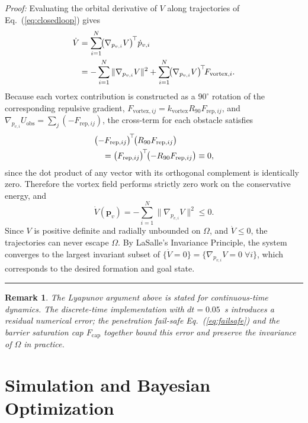 \documentclass[letterpaper, 10 pt, journal, twoside]{IEEEtran}
\newtheorem{remark}{Remark}
\def\qed{ \rule{.1in}{.1in}}
\newcommand{\eqnref}[1]{Eq.~(\ref{#1})}
\begin{document}
\textit{Proof:} Evaluating the orbital derivative of $V$ along trajectories
of \eqnref{eq:closedloop} gives
\begin{align}
  \dot{V}&=\sum_{i=1}^{N}\!\bigl(\nabla_{p_{v,i}}V\bigr)^{\!\top}\dot{p}_{v,i}\notag\\
         &=-\sum_{i=1}^{N}\|\nabla_{p_{v,i}}V\|^{2}
           +\sum_{i=1}^{N}\!\bigl(\nabla_{p_{v,i}}V\bigr)^{\!\top}\!F_{\mathrm{vortex},i}.
\end{align}
Because each vortex contribution is constructed as a $90^{\circ}$ rotation of
the corresponding repulsive gradient,
$F_{\mathrm{vortex},ij}=k_{\mathrm{vortex}}R_{90}F_{\mathrm{rep},ij}$, and
$\nabla_{p_{v,i}}U_{\mathrm{obs}}=\sum_{j}(-F_{\mathrm{rep},ij})$, the cross-term
for each obstacle satisfies
\begin{align}
  &\bigl(-F_{\mathrm{rep},ij}\bigr)^{\!\top}\!\bigl(R_{90}F_{\mathrm{rep},ij}\bigr)\notag\\
  &\quad=\bigl(F_{\mathrm{rep},ij}\bigr)^{\!\top}\!\bigl(-R_{90}F_{\mathrm{rep},ij}\bigr)
    \equiv 0,
\end{align}
since the dot product of any vector with its orthogonal complement is
identically zero.  Therefore the vortex field performs strictly zero work on
the conservative energy, and
\begin{equation}
  \dot{V}(\mathbf{p}_{v})=-\sum_{i=1}^{N}\|\nabla_{p_{v,i}}V\|^{2}\leq 0.
  \label{eq:Vdot}
\end{equation}
Since $V$ is positive definite and radially unbounded on $\Omega$, and
$\dot{V}\leq 0$, the trajectories can never escape $\Omega$.  By LaSalle's
Invariance Principle, the system converges to the largest invariant subset
of $\{\dot{V}=0\}=\{\nabla_{p_{v,i}}V=0\;\forall i\}$, which corresponds
to the desired formation and goal state. \qed

\begin{remark}
The Lyapunov argument above is stated for continuous-time dynamics.
The discrete-time implementation with $dt=0.05$~s introduces a residual
numerical error; the penetration fail-safe \eqnref{eq:failsafe} and the
barrier saturation cap $F_{\mathrm{cap}}$ together bound this error and
preserve the invariance of $\Omega$ in practice.
\end{remark}


\section{Simulation and Bayesian Optimization}
\label{sec:sim_setup}
\end{document}
